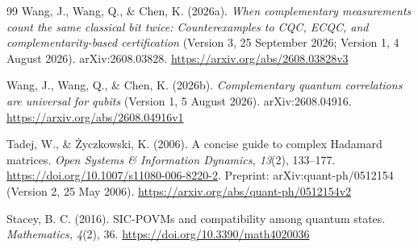 \documentclass[11pt,a4paper]{article}
\numberwithin{equation}{section}
\theoremstyle{remark}\newtheorem{remark}[theorem]{Remark}
\begin{document}
\begin{thebibliography}{99}
Wang, J., Wang, Q., \& Chen, K. (2026a).
\emph{When complementary measurements count the same classical bit twice: Counterexamples to CQC, ECQC, and complementarity-based certification} (Version 3, 25 September 2026; Version 1, 4 August 2026). arXiv:2608.03828.
\url{https://arxiv.org/abs/2608.03828v3}

Wang, J., Wang, Q., \& Chen, K. (2026b).
\emph{Complementary quantum correlations are universal for qubits} (Version 1, 5 August 2026). arXiv:2608.04916.
\url{https://arxiv.org/abs/2608.04916v1}

Tadej, W., \& \.{Z}yczkowski, K. (2006).
A concise guide to complex Hadamard matrices.
\emph{Open Systems \& Information Dynamics, 13}(2), 133--177.
\url{https://doi.org/10.1007/s11080-006-8220-2}.
Preprint: arXiv:quant-ph/0512154 (Version 2, 25 May 2006).
\url{https://arxiv.org/abs/quant-ph/0512154v2}

Stacey, B. C. (2016).
SIC-POVMs and compatibility among quantum states.
\emph{Mathematics, 4}(2), 36.
\url{https://doi.org/10.3390/math4020036}
\end{thebibliography}
\end{document}
